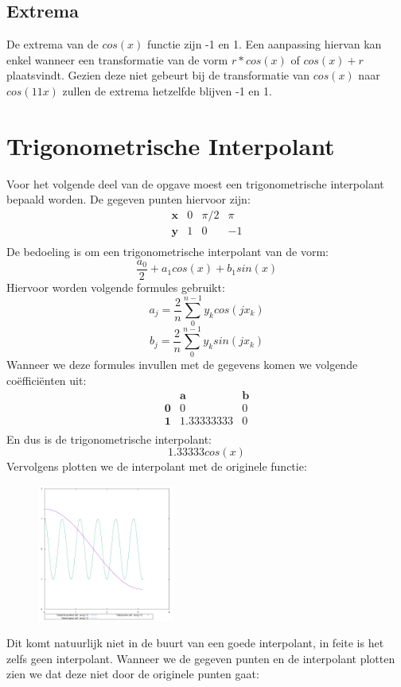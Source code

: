 \documentclass[10pt,a4paper,twocolumn]{article}
\begin{document}
\subsection{Extrema}
De extrema van de $cos(x)$ functie zijn -1 en 1. Een aanpassing hiervan kan enkel wanneer een transformatie van de vorm $r*cos(x)$ of $cos(x)+r$ plaatsvindt. Gezien deze niet gebeurt bij de transformatie van $cos(x)$ naar $cos(11x)$ zullen de extrema hetzelfde blijven -1 en 1.
\section{Trigonometrische Interpolant}
Voor het volgende deel van de opgave moest een trigonometrische interpolant bepaald worden. De gegeven punten hiervoor zijn:
$$
\begin{matrix}
\textbf{x} & 0 &  \pi/2 & \pi \\
\textbf{y} & 1 & 0 & -1 \\
\end{matrix}
$$
De bedoeling is om een trigonometrische interpolant van de vorm:
$$\frac{a_{0}}{2} + a_{1}cos(x)+b_{1}sin(x)$$
Hiervoor worden volgende formules gebruikt:
$$a_{j} = \frac{2}{n}\sum^{n-1}_{0}y_{k}cos(jx_{k})$$
$$b_{j} = \frac{2}{n}\sum^{n-1}_{0}y_{k}sin(jx_{k})$$
Wanneer we deze formules invullen met de gegevens komen we volgende coëfficiënten uit:
$$
\begin{matrix}
 & \textbf{a} & \textbf{b} \\
\textbf{0} & 0 &  0 \\
\textbf{1} & 1.33333333 & 0 \\
\end{matrix}
$$
En dus is de trigonometrische interpolant: 
$$1.33333cos(x)$$
Vervolgens plotten we de interpolant met de originele functie:
\begin{figure}[H]
\includegraphics[width=0.4\textwidth]{combined-3}
\end{figure}
Dit komt natuurlijk niet in de buurt van een goede interpolant, in feite is het zelfs geen interpolant. Wanneer we de gegeven punten en de interpolant plotten zien we dat deze niet door de originele punten gaat:
\end{document}

